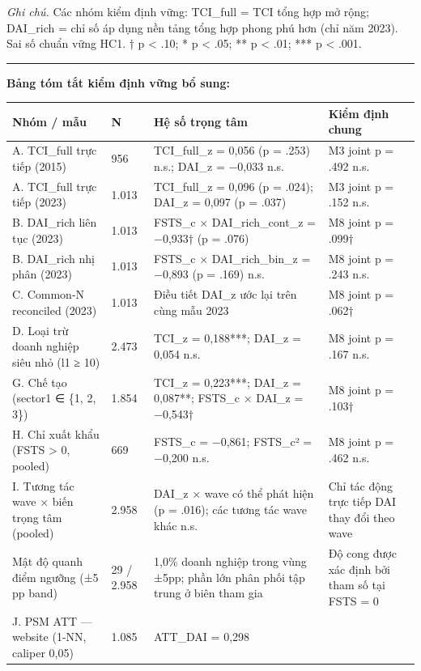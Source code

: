 \documentclass[12pt,a4paper]{article}
\begin{document}
\emph{Ghi chú.} Các nhóm kiểm định vững: TCI\_full = TCI tổng hợp mở
rộng; DAI\_rich = chỉ số áp dụng nền tảng tổng hợp phong phú hơn (chỉ
năm 2023). Sai số chuẩn vững HC1. † p \textless{} .10; * p \textless{}
.05; ** p \textless{} .01; *** p \textless{} .001.

\begin{center}\rule{0.5\linewidth}{0.5pt}\end{center}

\textbf{Bảng tóm tắt kiểm định vững bổ sung:}

\begin{longtable}[]{@{}llll@{}}
\toprule\noalign{}
Nhóm / mẫu & N & Hệ số trọng tâm & Kiểm định chung \\
\midrule\noalign{}
\endhead
\bottomrule\noalign{}
\endlastfoot
A. TCI\_full trực tiếp (2015) & 956 & TCI\_full\_z = 0,056 (p = .253)
n.s.; DAI\_z = −0,033 n.s. & M3 joint p = .492 n.s. \\
A. TCI\_full trực tiếp (2023) & 1.013 & TCI\_full\_z = 0,096 (p = .024);
DAI\_z = 0,097 (p = .037) & M3 joint p = .152 n.s. \\
B. DAI\_rich liên tục (2023) & 1.013 & FSTS\_c × DAI\_rich\_cont\_z =
−0,933† (p = .076) & M8 joint p = .099† \\
B. DAI\_rich nhị phân (2023) & 1.013 & FSTS\_c × DAI\_rich\_bin\_z =
−0,893 (p = .169) n.s. & M8 joint p = .243 n.s. \\
C. Common-N reconciled (2023) & 1.013 & Điều tiết DAI\_z ước lại trên
cùng mẫu 2023 & M8 joint p = .062† \\
D. Loại trừ doanh nghiệp siêu nhỏ (l1 ≥ 10) & 2.473 & TCI\_z = 0,188***;
DAI\_z = 0,054 n.s. & M8 joint p = .167 n.s. \\
G. Chế tạo (sector1 ∈ \{1, 2, 3\}) & 1.854 & TCI\_z = 0,223***; DAI\_z =
0,087**; FSTS\_c × DAI\_z = −0,543† & M8 joint p = .103† \\
H. Chỉ xuất khẩu (FSTS \textgreater{} 0, pooled) & 669 & FSTS\_c =
−0,861; FSTS\_c² = −0,200 n.s. & M8 joint p = .462 n.s. \\
I. Tương tác wave × biến trọng tâm (pooled) & 2.958 & DAI\_z × wave có
thể phát hiện (p = .016); các tương tác wave khác n.s. & Chỉ tác động
trực tiếp DAI thay đổi theo wave \\
Mật độ quanh điểm ngưỡng (±5 pp band) & 29 / 2.958 & 1,0\% doanh nghiệp
trong vùng ±5pp; phần lớn phân phối tập trung ở biên tham gia & Độ cong
được xác định bởi tham số tại FSTS = 0 \\
J. PSM ATT --- website (1-NN, caliper 0,05) & 1.085 & ATT\_DAI = 0,298

\end{longtable}
\end{document}
